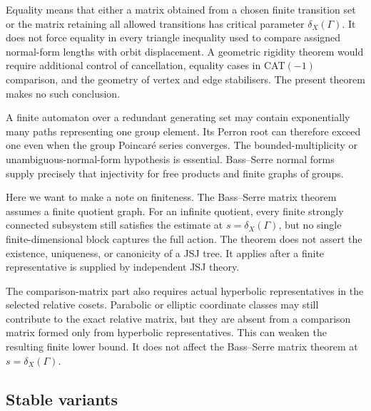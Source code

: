 \documentclass[11pt]{article}
\theoremstyle{definition}
\begin{document}
Equality means that either a matrix obtained from a chosen finite transition set or the matrix
retaining all allowed transitions has critical parameter $\delta_X(\Gamma)$.  It does not force equality in every triangle inequality used to compare assigned normal-form lengths
with orbit displacement.  A geometric rigidity theorem would require additional control of
cancellation, equality cases in CAT$(-1)$ comparison, and the geometry of vertex and edge
stabilisers.  The present theorem makes no such conclusion.

A finite automaton over a redundant generating set may contain exponentially many paths
representing one group element.  Its Perron root can therefore exceed one even when the
group Poincar\'e series converges.  The bounded-multiplicity or unambiguous-normal-form
hypothesis is essential.  Bass--Serre normal forms supply precisely that injectivity for free
products and finite graphs of groups.

Here we want to make a note on finiteness. The Bass--Serre matrix theorem assumes a finite quotient graph.  For an infinite quotient,
every finite strongly connected subsystem still satisfies the estimate at $s=\delta_X(\Gamma)$, but
no single finite-dimensional block captures the full action.  The theorem does not assert the
existence, uniqueness, or canonicity of a JSJ tree.  It applies after a finite representative is
supplied by independent JSJ theory.

The comparison-matrix part also requires actual hyperbolic representatives in the selected relative cosets.
Parabolic or elliptic coordinate classes may still contribute to the exact relative matrix, but
they are absent from a comparison matrix formed only from hyperbolic representatives.  This can weaken the resulting finite lower bound. It does not affect the Bass--Serre matrix theorem at $s=\delta_X(\Gamma)$.

\subsection{Stable variants}
\end{document}
